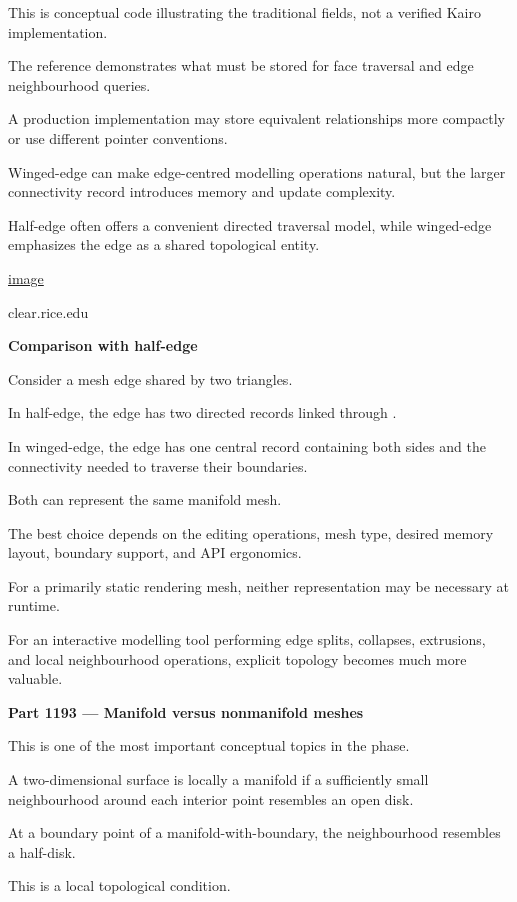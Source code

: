 This is conceptual code illustrating the traditional fields, not a verified Kairo implementation.

The reference demonstrates what must be stored for face traversal and edge neighbourhood queries.

A production implementation may store equivalent relationships more compactly or use different pointer conventions.

Winged-edge can make edge-centred modelling operations natural, but the larger connectivity record introduces memory and update complexity.

Half-edge often offers a convenient directed traversal model, while winged-edge emphasizes the edge as a shared topological entity. 

\href{https://www.google.com/s2/favicons?domain=https://www.clear.rice.edu&sz=32}{image}

clear.rice.edu

\textbf{Comparison with half-edge}

Consider a mesh edge shared by two triangles.

In half-edge, the edge has two directed records linked through .

In winged-edge, the edge has one central record containing both sides and the connectivity needed to traverse their boundaries.

Both can represent the same manifold mesh.

The best choice depends on the editing operations, mesh type, desired memory layout, boundary support, and API ergonomics.

For a primarily static rendering mesh, neither representation may be necessary at runtime.

For an interactive modelling tool performing edge splits, collapses, extrusions, and local neighbourhood operations, explicit topology becomes much more valuable.

\textbf{Part 1193 --- Manifold versus nonmanifold meshes}

This is one of the most important conceptual topics in the phase.

A two-dimensional surface is locally a manifold if a sufficiently small neighbourhood around each interior point resembles an open disk.

At a boundary point of a manifold-with-boundary, the neighbourhood resembles a half-disk.

This is a local topological condition.

